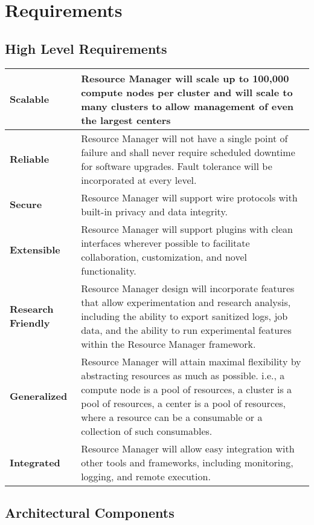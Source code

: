 \section{Requirements}\label{Reqs}

\subsection{High Level Requirements}\label{ReqsHiLev}

\begin{tabular}{|p{4cm}|p{12cm}|}\hline
  \textbf{Scalable} & Resource Manager will scale up to 100,000 compute
	nodes per cluster and will scale to many clusters to allow
	management of even the largest centers \\
  \hline
  \textbf{Reliable} & Resource Manager will not have a single point of
	failure and shall never require scheduled downtime for software
	upgrades. Fault tolerance will be incorporated at every level. \\
  \hline
  \textbf{Secure} & Resource Manager will support wire protocols with
	built-in privacy and data integrity. \\
  \hline
  \textbf{Extensible} & Resource Manager will support plugins with clean
	interfaces wherever possible to facilitate collaboration,
	customization, and novel functionality. \\
  \hline
  \textbf{Research Friendly} & Resource Manager design will incorporate
	features that allow experimentation and research analysis,
	including the ability to export sanitized logs, job data, and
	the ability to run experimental features within the Resource
	Manager framework. \\
  \hline
  \textbf{Generalized} & Resource Manager will attain maximal flexibility
	by abstracting resources as much as possible. i.e., a compute node
	is a pool of resources, a cluster is a pool of resources, a center
	is a pool of resources, where a resource can be a consumable or a
	collection of such consumables. \\
  \hline
  \textbf{Integrated} & Resource Manager will allow easy integration with
	other tools and frameworks, including monitoring, logging, and
	remote execution. \\
  \hline
\end{tabular}

\subsection{Architectural Components}\label{ReqsArch}

